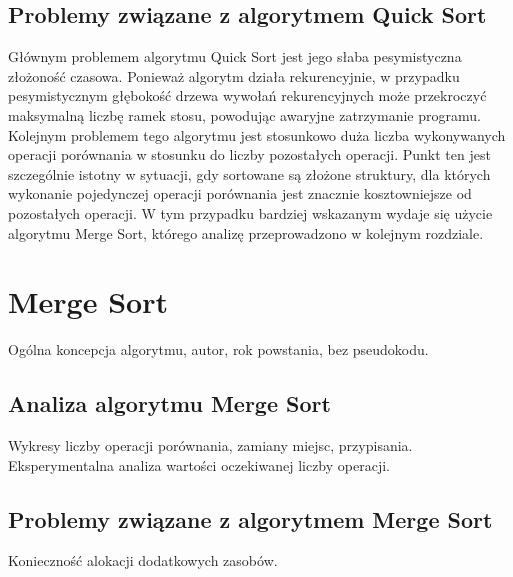 \begin{figure}[H]
	\centering
	
	\caption[]{}
	\label{fig:quick-sort-density}
\end{figure}

\subsection{Problemy związane z algorytmem Quick Sort}
Głównym problemem algorytmu Quick Sort jest jego słaba pesymistyczna złożoność czasowa. Ponieważ algorytm działa rekurencyjnie, w przypadku pesymistycznym głębokość drzewa wywołań rekurencyjnych może przekroczyć maksymalną liczbę ramek stosu, powodując awaryjne zatrzymanie programu.\\

Kolejnym problemem tego algorytmu jest stosunkowo duża liczba wykonywanych operacji porównania w stosunku do liczby pozostałych operacji. Punkt ten jest szczególnie istotny w sytuacji, gdy sortowane są złożone struktury, dla których
wykonanie pojedynczej operacji porównania jest znacznie kosztowniejsze od pozostałych operacji. W tym przypadku bardziej wskazanym wydaje się użycie algorytmu Merge Sort, którego analizę przeprowadzono w kolejnym rozdziale.


\section{Merge Sort}
Ogólna koncepcja algorytmu, autor, rok powstania, bez pseudokodu.

\subsection{Analiza algorytmu Merge Sort}
Wykresy liczby operacji porównania, zamiany miejsc, przypisania. Eksperymentalna analiza wartości
oczekiwanej liczby operacji.


\subsection{Problemy związane z algorytmem Merge Sort}
Konieczność alokacji dodatkowych zasobów.